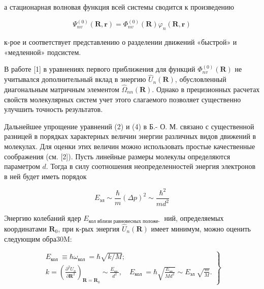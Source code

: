 \documentclass[10pt]{article}
\begin{document}
а стационарная волновая функция всей системы сводится к произведению



\[

\Psi_{n v}^{(0)}(\boldsymbol{R}, \boldsymbol{r})=\Phi_{n v}^{(0)}(\boldsymbol{R}) \varphi_{n}(\boldsymbol{R}, \boldsymbol{r})

\]



к-рое и соответствует представлению о разделении движений «быстрой» и «медленной» подсистем.



В работе [1] в уравнениях первого приближения для функций $\Phi_{n v}^{(0)}(\boldsymbol{R})$ не учитывался дополнительный вклад в энергию $\hat{U}_{n}(\boldsymbol{R})$, обусловленный диагональным матричным элементом $\hat{\Omega}_{n n}(\boldsymbol{R})$. Однако в прецизионных расчетах свойств молекулярных систем учет этого слагаемого позволяет существенно улучшить точность результатов.



Дальнейшее упрощение уравнений (2) и (4) в Б.- О. М. связано с существенной разницей в порядках характерных величин энергии различных видов движений в молекулах. Для оценки этих величин можно использовать простые качественные соображения (см. [2]). Пусть линейные размеры молекулы определяются параметром $d$. Тогда в силу соотношения неопределенностей энергия электронов в ней будет иметь порядок



\[

E_{э л} \sim \frac{\hbar}{m}(\Delta p)^{2} \sim \frac{\hbar^{2}}{m d^{2}}

\]



Энергию колебаний ядер $E_{\text {кол вблизи равновесных положе- }}$ ний, определяемых координатами $\boldsymbol{R}_{0}$, при к-рых энергия $\hat{U}_{n}(\boldsymbol{R})$ имеет минимум, можно оценить следующим обра30M:



\[

\left.\begin{array}{c}

E_{\text {кол }} \equiv \hbar \omega_{\text {кол }}=\hbar \sqrt{k / M} ; \\

k=\left(\frac{\partial^{2} U_{n}}{\partial \boldsymbol{R}^{2}}\right)_{\boldsymbol{R}=\boldsymbol{R}_{0}} \sim \frac{E_{\text {эл }}}{d^{2}}, \quad E_{\text {кол }}=\hbar \sqrt{\frac{E_{\text {эл }}}{M d^{2}}} \sim E_{\text {эл }} \sqrt{\frac{m}{M}} .

\end{array}\right\}

\]
\end{document}
